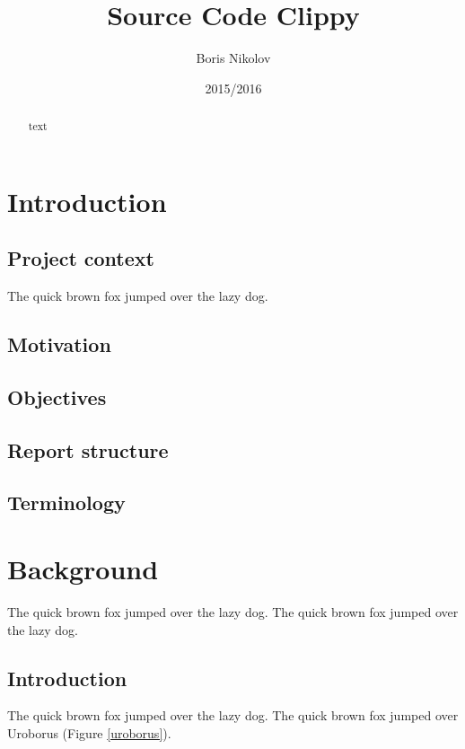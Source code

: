 \documentclass{l4proj}
\begin{document}
\title{Source Code Clippy}
\author{Boris Nikolov}
\date{2015/2016}
\maketitle

\begin{abstract}
text
\end{abstract}

\educationalconsent
%
%
\tableofcontents

\chapter{Introduction}

\section{Project context}
The quick brown fox jumped over the lazy dog.


\section{Motivation}

\section{Objectives}

\section{Report structure}

\section{Terminology}

\chapter{Background}
The quick brown fox jumped over the lazy dog.
The quick brown fox jumped over the lazy dog.

\section{Introduction}
The quick brown fox jumped over the lazy dog.
The quick brown fox jumped over Uroborus (Figure \ref{uroborus}).
\end{document}
